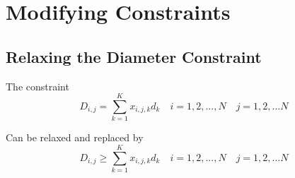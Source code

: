 \documentclass[12pt]{article}
\begin{document}
\section{Modifying Constraints}
\begin{comment}
\subsection{Integrality of Connection variable}
The constraints
\begin{equation}
\begin{aligned}
    & Con_{i,j} + Con_{j,i} && \leq 1 && i = 1, 2, ..., N \quad && j = i+1, ... N\\
    & Con_{i,j} &&\in \{0,1\} && i = 1, 2, ..., N \quad && j = 1, 2, ... N\\
\end{aligned}
\end{equation}

can be replaced by

\begin{equation}
\begin{aligned}
    & Con_{i,j} && \leq 1 && i = 1, 2, ..., N \quad && j = 1, 2, ... N\\
    & Con_{i,j} && \geq 0 && i = 1, 2, ..., N \quad && j = 1, 2, ... N\\
    & Con_{i,j}*Con_{j,i} && \leq 0 && i = 1, 2, ..., N \quad && j = i+1, ... N\\
\end{aligned}
\end{equation}
and the requirement on minimal head at each Node will drive the connections between some nodes to be non-zero. Note that for predefined topologies, those constraints are not needed since the connections will be given as an input.
\end{comment}
\subsection{Relaxing the Diameter Constraint}
The constraint 
\begin{equation}
D_{i,j} = \sum_{k=1}^{K}x_{i,j,k}d_k \quad i = 1, 2, ..., N \quad j = 1, 2, ... N
\end{equation}

Can be relaxed and replaced by 
\begin{equation}
D_{i,j} \geq \sum_{k=1}^{K}x_{i,j,k}d_k \quad i = 1, 2, ..., N \quad j = 1, 2, ... N
\end{equation}
\end{document}
